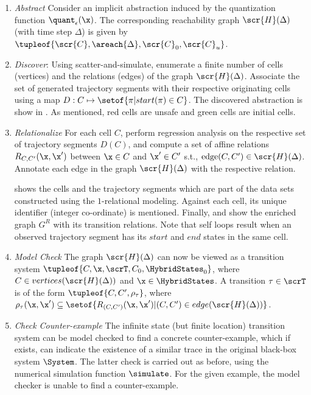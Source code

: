 \begin{enumerate}
    \item{\emph{Abstract}} Consider an implicit abstraction induced by the quantization
    function $\quant_\epsilon(\x)$. The corresponding reachability
    graph $\scr{H}(\Delta)$ (with time step $\Delta$) is given by
    $\tupleof{\scr{C},\areach{\Delta}, \scr{C}_0, \scr{C}_u}$.
\item{\emph{Discover}}: Using scatter-and-simulate, enumerate a finite number
    of cells (vertices) and the relations (edges) of the graph
    $\scr{H}(\Delta)$. Associate the set of generated trajectory
    segments with their respective originating cells using a map $D:C
    \mapsto \setof{\pi | start(\pi) \in C}$. The discovered
    abstraction is show in . As mentioned, red cells
    are unsafe and green cells are initial cells.
\item{\emph{Relationalize}} For each cell $C$, perform regression analysis on
    the respective set of trajectory segments $D(C)$, and compute a
    set of affine relations $R_{C,C'}(\x,\x')$ between $\x \in C$ and $\x'
    \in C'$ s.t., $\text{edge} (C,C') \in \scr{H}(\Delta)$. Annotate
    each edge in the graph $\scr{H}(\Delta)$ with the respective
    relation.

     shows the cells and the trajectory segments which
    are part of the data sets constructed using the $1$-relational
    modeling. Against each cell, its unique identifier (integer
    co-ordinate) is mentioned.  Finally,  and
     show the enriched graph $G^R$ with its transition
    relations. Note that self loops result when an observed trajectory
    segment has its $start$ and $end$ states in the same cell.

\item{\emph{Model Check}} The graph $\scr{H}(\Delta)$ can now be viewed as a
    transition system $\tupleof{C,\x,\scrT,C_0,\HybridStates_0}$,
    where $C \in vertices(\scr{H}(\Delta))$ and $\x \in
    \HybridStates$. A transition $\tau \in \scrT$ is of the form
    $\tupleof{C, C',\rho_{\tau}}$, where $\rho_{\tau}(\x,\x')
    \subseteq \setof{R_{(C,C')}(\x,\x') |( C,C') \in
    edge(\scr{H}(\Delta))}$.
\item{\emph{Check Counter-example}} The infinite state (but finite location) transition system can
    be model checked to find a concrete counter-example, which if
    exists, can indicate the existence of a similar trace in the
    original black-box system $\System$. The latter check is carried
    out as before, using the numerical simulation function
    $\simulate$. For the given example, the model checker is unable to
    find a counter-example.
\end{enumerate}

